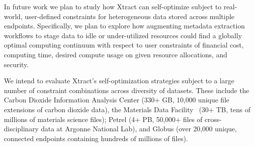 \documentclass[sigconf, 9pt]{acmart}
\newcommand{\tyler}[1]{}
\newcommand{\kyle}[1]{}
\newcommand{\tyler}[1]{{\textcolor{cyan}{ tyler: #1 }}}
\newcommand{\kyle}[1]{{\textcolor{purple}{ Kyle: #1 }}}
\newcommand{\name}{Xtract}
\begin{document}
In future work we plan to study how \name{} can self-optimize subject to real-world, user-defined constraints for heterogeneous data stored across multiple 
endpoints.  Specifically, we plan to explore how augmenting metadata extraction workflows to stage data to idle or under-utilized resources could 
find a globally optimal computing continuum with respect to user constraints of financial cost, computing time, desired compute usage on 
given resource allocations, and security. 

We intend to evaluate \name{}'s self-optimization strategies subject to a large number of constraint combinations across diversity of datasets. 
These include the Carbon Dioxide Information Analysis Center (330+ GB, 10,000 
unique file extensions of carbon dioxide data), the Materials Data Facility~\cite{ blaiszik2019mdf} (30+ TB, tens of millions of materials science files); 
Petrel (4+ PB, 50,000+ files of cross-disciplinary data at Argonne National Lab), and Globus (over 20,000 unique, connected 
endpoints containing hundreds of millions of files). \tyler{fact check Globus}

%
%
\end{document}
